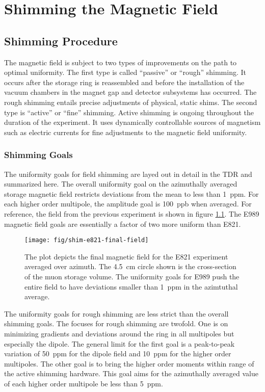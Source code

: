 \chapter {Shimming the Magnetic Field} \label{ch:shimming}

\section{Shimming Procedure}

The \gmtwo magnetic field is subject to two types of improvements on the path to optimal uniformity.  The first type is called ``passive'' or ``rough'' shimming.  It occurs after the storage ring is reassembled and before the installation of the vacuum chambers in the magnet gap and detector subsystems has occurred. The rough shimming entails precise adjustments of physical, static shims. The second type is ``active'' or ``fine'' shimming.  Active shimming is ongoing throughout the duration of the experiment.  It uses dynamically controllable sources of magnetism such as electric currents for fine adjustments to the magnetic field uniformity.

\subsection{Shimming Goals}
The uniformity goals for field shimming are layed out in detail in the TDR \cite{e989-tdr} and summarized here.  The overall uniformity goal on the azimuthally averaged storage magnetic field restricts deviations from the mean to less than \SI{1}{ppm}.  For each higher order multipole, the amplitude goal is \SI{100}{ppb} when averaged.  For reference, the field from the previous experiment is shown in figure \ref{fig:shim-e821-final-field}.  The E989 magnetic field goals are essentially a factor of two more uniform than E821.

\begin{figure}
\centering
\texttt{[image: fig/shim-e821-final-field]}
\caption{
    The plot depicts the final magnetic field for the E821 \gmtwo experiment averaged over azimuth.  The \SI{4.5}{\cm} circle shown is the cross-section of the muon storage volume.  The uniformity goals for E989 push the entire field to have deviations smaller than \SI{1}{ppm} in the azimtuthal average. 
    \label{fig:shim-e821-final-field}
}
\end{figure}

The uniformity goals for rough shimming are less strict than the overall shimming goals.  The focuses for rough shimming are twofold. One is on minimizing gradients and deviations around the ring in all multipoles but especially the dipole.  The general limit for the first goal is a peak-to-peak variation of \SI{50}{ppm} for the dipole field and \SI{10}{ppm} for the higher order multipoles.  The other goal is to bring the higher order moments within range of the active shimming hardware.  This goal aims for the azimuthally averaged value of each higher order multipole be less than \SI{5}{ppm}.

